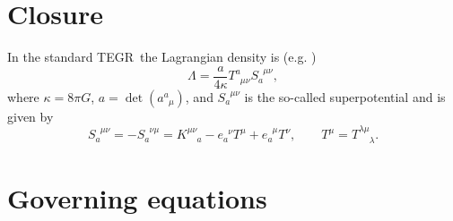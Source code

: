 \documentclass[
10pt, %
a4paper, %
oneside, %
headinclude,footinclude, %
BCOR5mm, %
]{scrartcl}
\newcommand{\itetr}[2]{e^{\phantom{#2}#1}_{#2}}
\newcommand{\tetr}[2]{a^{#1}_{\phantom{#1}#2}}
\newcommand{\Tors}[2]{T^{#1}_{\phantom{a}#2}}
\newcommand{\Supp}[2]{S_{#1}^{\phantom{a}#2}}	%
\newcommand{\tegr}{TEGR}
\begin{document}
\section{Closure}



In the standard \tegr\ the Lagrangian density is (e.g. \cite{Krssak2017})
\begin{equation}
\Lambda = \frac{a}{4\kappa} \Tors{a}{\mu\nu}\Supp{a}{\mu\nu},
\end{equation}
where $ \kappa = 8 \pi G $, $ a = \det(\tetr{a}{\mu}) $, and $ \Supp{a}{\mu\nu} $ is the so-called 
superpotential and is given by
\begin{equation}
\Supp{a}{\mu\nu} = -\Supp{a}{\nu\mu} = K^{\mu\nu}_{\phantom{\mu\nu}a} - \itetr{\nu}{a} T^\mu + 
\itetr{\mu}{a} 
T^\nu, \qquad T^\mu = T^{\lambda\mu}_{\phantom{\lambda\mu}\lambda}.
\end{equation}


\section{Governing equations}

\printbibliography
\end{document}
